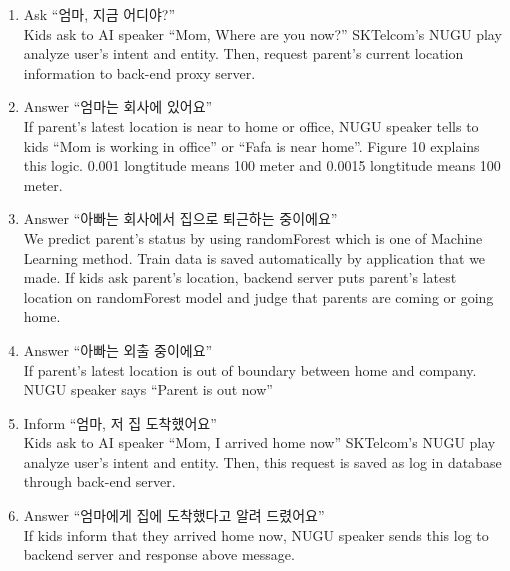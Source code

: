 \documentclass[conference]{IEEEtran}
\begin{document}
\begin{enumerate}
    \item Ask “엄마, 지금 어디야?”\\
    Kids ask to AI speaker “Mom, Where are you now?”
    SKTelcom’s NUGU play analyze user’s intent and entity. Then, request parent’s current location information to back-end proxy server.\\
    \item Answer “엄마는 회사에 있어요” \\
    If parent’s latest location is near to home or office, NUGU speaker tells to kids “Mom is working in office” or “Fafa is near home”. Figure 10 explains this logic. 0.001 longtitude means 100 meter and 0.0015 longtitude means 100 meter.\\
    \item Answer “아빠는 회사에서 집으로 퇴근하는 중이에요”\\
    We predict parent’s status by using randomForest which is one of Machine Learning method. Train data is saved automatically by application that we made. If kids ask parent’s location, backend server puts parent’s latest location on randomForest model and judge that parents are coming or going home. \\
    \item Answer “아빠는 외출 중이에요”\\
    If parent’s latest location is out of boundary between home and company. NUGU speaker says “Parent is out now”\\
    \item Inform “엄마, 저 집 도착했어요”\\
    Kids ask to AI speaker “Mom, I arrived home now”
    SKTelcom’s NUGU play analyze user’s intent and entity. Then, this request is saved as log in database through back-end server.\\
    \item Answer “엄마에게 집에 도착했다고 알려 드렸어요” \\
    If kids inform that they arrived home now, NUGU speaker sends this log to backend server and response above message.\\
\end{enumerate}
\end{document}
